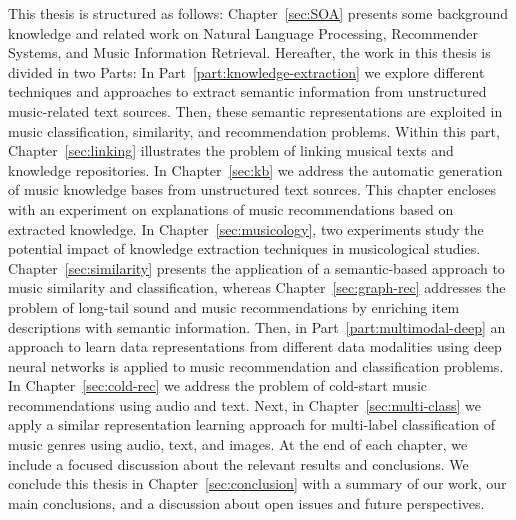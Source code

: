 This thesis is structured as follows: Chapter~\ref{sec:SOA} presents some background knowledge and related work on Natural Language Processing, Recommender Systems, and Music Information Retrieval. Hereafter, the work in this thesis is divided in two Parts: In Part~\ref{part:knowledge-extraction} we explore different techniques and approaches to extract semantic information from unstructured music-related text sources. Then, these semantic representations are exploited in music classification, similarity, and recommendation problems. Within this part, Chapter~\ref{sec:linking} illustrates the problem of linking musical texts and knowledge repositories. In Chapter~\ref{sec:kb} we address the automatic generation of music knowledge bases from unstructured text sources. This chapter encloses with an experiment on explanations of music recommendations based on extracted knowledge. In Chapter~\ref{sec:musicology}, two experiments study the potential impact of knowledge extraction techniques in musicological studies.
Chapter~\ref{sec:similarity} presents the application of a semantic-based approach to music similarity and classification, whereas Chapter~\ref{sec:graph-rec} addresses the problem of long-tail sound and music recommendations by enriching item descriptions with semantic information.
Then, in Part~\ref{part:multimodal-deep} an approach to learn data representations from different data modalities using deep neural networks is applied to music recommendation and classification problems. In Chapter~\ref{sec:cold-rec} we address the problem of cold-start music recommendations using audio and text. Next, in Chapter~\ref{sec:multi-class} we apply a similar representation learning approach for multi-label classification of music genres using audio, text, and images.
At the end of each chapter, we include a focused discussion about the relevant results and conclusions. We conclude this thesis in Chapter~\ref{sec:conclusion} with a summary of our work, our main conclusions, and a discussion about open issues and future perspectives.




